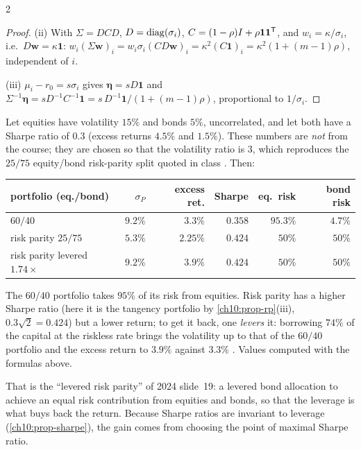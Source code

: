 \begin{paracol}{2}
\begin{proof}
(ii) With $\Sigma=D C D$, $D=\operatorname{diag}(\sigma_i)$, $C=(1-\rho)I+\rho\bm 1\bm 1^{\mathsf T}$, and
$w_i=\kappa/\sigma_i$, i.e.\ $D\bm w=\kappa\bm 1$: $w_i(\Sigma\bm w)_i=w_i\sigma_i(C D\bm w)_i=\kappa^2(C\bm 1)_i=\kappa^2(1+(m-1)\rho)$,
independent of $i$.

(iii) $\mu_i-r_0=s\sigma_i$ gives $\bm\eta=sD\bm 1$ and $\Sigma^{-1}\bm\eta=sD^{-1}C^{-1}\bm 1=
s\,D^{-1}\bm 1/(1+(m-1)\rho)$, proportional to $1/\sigma_i$.
\end{proof}

\begin{example}\label{ch10:ex-rp}
Let equities have volatility $15\%$ and bonds $5\%$, uncorrelated, and let both have a Sharpe ratio of $0.3$
(excess returns $4.5\%$ and $1.5\%$). These numbers are \emph{not} from the course; they are chosen so that the
volatility ratio is $3$, which reproduces the $25/75$ equity/bond risk-parity split quoted in class
. Then:
\begin{center}
\begin{tabular}{@{}lrrrrr@{}}
\toprule
portfolio (eq./bond) & $\sigma_P$ & excess ret. & Sharpe & eq.\ risk & bond risk\\
\midrule
$60/40$ & $9.2\%$ & $3.3\%$ & $0.358$ & $95.3\%$ & $4.7\%$\\
risk parity $25/75$ & $5.3\%$ & $2.25\%$ & $0.424$ & $50\%$ & $50\%$\\
risk parity levered $1.74\times$ & $9.2\%$ & $3.9\%$ & $0.424$ & $50\%$ & $50\%$\\
\bottomrule
\end{tabular}
\end{center}
The $60/40$ portfolio takes $95\%$ of its risk from equities. Risk parity has a higher Sharpe ratio (here it is
the tangency portfolio by \cref{ch10:prop-rp}(iii), $0.3\sqrt2=0.424$) but a lower return; to get it back, one
\emph{levers} it: borrowing $74\%$ of the capital at the riskless rate brings the volatility up to that of the $60/40$
portfolio and the excess return to $3.9\%$ against $3.3\%$
. Values computed with the formulas above.
\end{example}
That is the ``levered risk parity'' of 2024 slide~19: a levered bond allocation to achieve an equal risk
contribution from equities and bonds, so that the leverage is what buys back the return. Because Sharpe ratios
are invariant to leverage (\cref{ch10:prop-sharpe}), the gain comes from choosing the point of maximal Sharpe ratio.


\end{paracol}
